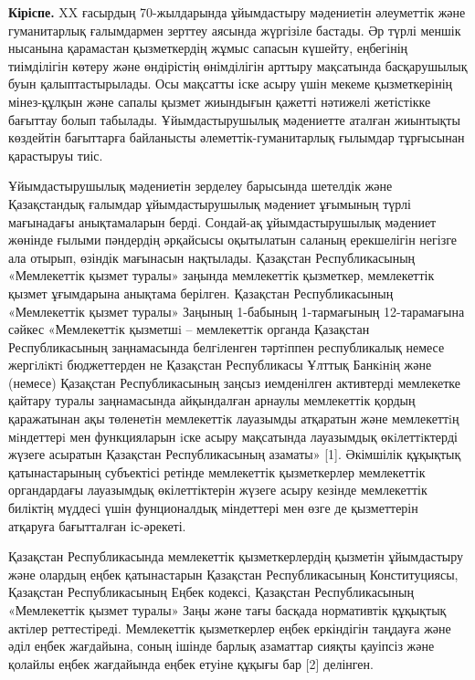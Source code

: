 \begin{multicols}{2}
{\bfseries Кіріспе.} XX ғасырдың 70-жылдарында ұйымдастыру мәдениетін
әлеуметтік және гуманитарлық ғалымдармен зерттеу аясында жүргізіле
бастады. Әр түрлі меншік нысанына қарамастан қызметкердің жұмыс сапасын
күшейту, еңбегінің тиімділігін көтеру және өндірістің өнімділігін
арттыру мақсатында басқарушылық буын қалыптастырылады. Осы мақсатты іске
асыру үшін мекеме қызметкерінің мінез-құлқын және сапалы қызмет
жиындығын қажетті нәтижелі жетістікке бағыттау болып табылады.
Ұйымдастырушылық мәдениетте аталған жиынтықты көздейтін бағыттарға
байланысты әлеметтік-гуманитарлық ғылымдар тұрғысынан қарастыруы тиіс.

Ұйымдастырушылық мәдениетін зерделеу барысында шетелдік және
Қазақстандық ғалымдар ұйымдастырушылық мәдениет ұғымының түрлі
мағынадағы анықтамаларын берді. Сондай-ақ ұйымдастырушылық мәдениет
жөнінде ғылыми пәндердің әрқайсысы оқытылатын саланың ерекшелігін
негізге ала отырып, өзіндік мағынасын нақтылады. Қазақстан
Республикасының «Мемлекеттік қызмет туралы» заңында мемлекеттік
қызметкер, мемлекеттік қызмет ұғымдарына анықтама берілген. Қазақстан
Республикасының «Мемлекеттік қызмет туралы» Заңының 1-бабының
1-тармағының 12-тарамағына сәйкес «Мемлекеттiк қызметшi -- мемлекеттiк
органда Қазақстан Республикасының заңнамасында белгiленген тәртiппен
республикалық немесе жергiлiктi бюджеттерден не Қазақстан Республикасы
Ұлттық Банкiнiң және (немесе) Қазақстан Республикасының заңсыз
иемденілген активтерді мемлекетке қайтару туралы заңнамасында
айқындалған арнаулы мемлекеттік қордың қаражатынан ақы төленетiн
мемлекеттiк лауазымды атқаратын және мемлекеттiң мiндеттерi мен
функцияларын iске асыру мақсатында лауазымдық өкiлеттiктерді жүзеге
асыратын Қазақстан Республикасының азаматы» {[}1{]}. Әкімшілік құқықтық
қатынастарының субъектісі ретінде мемлекеттік қызметкерлер мемлекеттік
органдардағы лауазымдық өкілеттіктерін жүзеге асыру кезінде мемлекеттік
биліктің мүддесі үшін фунционалдық міндеттері мен өзге де қызметтерін
атқаруға бағытталған іс-әрекеті.

Қазақстан Республикасында мемлекеттік қызметкерлердің қызметін
ұйымдастыру және олардың еңбек қатынастарын Қазақстан Республикасының
Конституциясы, Қазақстан Республикасының Еңбек кодексі, Қазақстан
Республикасының «Мемлекеттік қызмет туралы» Заңы және тағы басқада
нормативтік құқықтық актілер реттестіреді. Мемлекеттік қызметкерлер
еңбек еркіндігін таңдауға және әділ еңбек жағдайына, соның ішінде барлық
азаматтар сияқты қауіпсіз және қолайлы еңбек жағдайында еңбек етуіне
құқығы бар {[}2{]} делінген.


\end{multicols}
